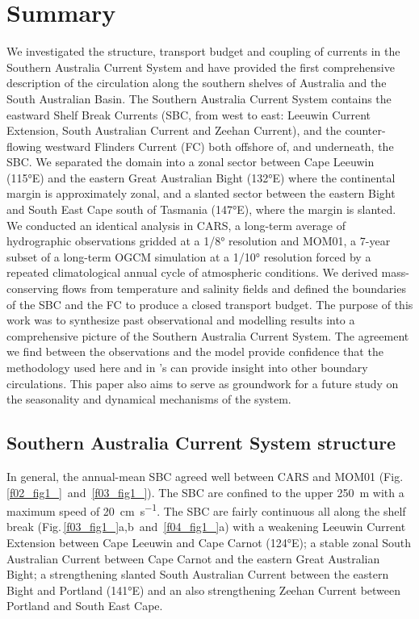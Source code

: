 \documentclass[preprint,3p,review,12pt]{elsarticle}
\newcommand{\citepos}[1]{\citeauthor{#1}'s \citeyearpar{#1}}
\begin{document}
\section{Summary}\label{Summary}
We investigated the structure, transport budget and coupling of currents in the Southern Australia Current System and have provided the first  comprehensive
description
of the circulation along the southern shelves of Australia and the South Australian Basin. The Southern Australia Current System contains the eastward Shelf Break Currents (SBC, from west to east: Leeuwin Current Extension, South Australian Current and Zeehan Current), and the counter-flowing westward Flinders Current (FC) both offshore of, and underneath, the SBC\@.
We separated the domain into a zonal sector between Cape Leeuwin (\ang{115}E) and the eastern Great Australian Bight (\ang{132}E) where the continental margin is approximately zonal, 
and a slanted sector between the eastern Bight and South East Cape south of Tasmania (\ang{147}E),
where the margin is slanted. We conducted an identical analysis in CARS, a long-term average of hydrographic observations gridded at a 1/\ang{8} resolution
and MOM01, a 7-year
subset of a long-term OGCM simulation
at a 1/\ang{10} resolution
forced by a repeated climatological annual cycle of
atmospheric conditions.
We derived mass-conserving flows from temperature and salinity fields and defined the boundaries of the SBC and the FC to produce a closed transport budget. The purpose of this work was to
synthesize past observational and modelling results into a comprehensive picture
of the Southern Australia Current System. The agreement we find between the observations and the model provide confidence that the methodology used here and in \citepos{Furue2017} can provide insight into other boundary circulations. This paper also aims to serve as groundwork for a future study on the seasonality and dynamical mechanisms of the system. 

\subsection{Southern Australia Current System structure}
In general, the annual-mean SBC agreed well between CARS and MOM01 (Fig.\,\ref{f02_fig1_}~and~\ref{f03_fig1_}). The SBC are confined to
 the upper \SI{250}{m} with a maximum speed of \SI{20}{cm.s^{-1}}.
The SBC are fairly continuous all along the shelf break
(Fig.\,\ref{f03_fig1_}a,b~and~\ref{f04_fig1_}a)
with a weakening Leeuwin Current Extension between Cape Leeuwin and Cape Carnot (\ang{124}E); a stable zonal South Australian Current between Cape Carnot and the eastern Great Australian Bight; a strengthening slanted South Australian Current between the eastern Bight and Portland (\ang{141}E) and an also strengthening Zeehan Current between Portland and South East Cape.
\end{document}
